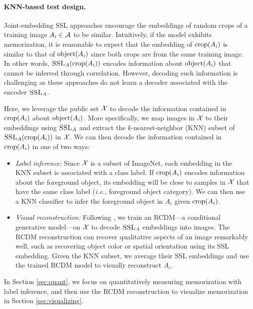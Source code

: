 \paragraph{KNN-based test design.} Joint-embedding SSL approaches encourage the embeddings of random crops of a training image $A_i \in \mathcal{A}$ to be similar. Intuitively, if the model exhibits \dejavu memorization, it is reasonable to expect that the embedding of $\mathrm{crop}({A_i})$ is similar to that of $\mathrm{object}({A_i})$ since both crops are from the same training image. In other words, $\textsc{SSL}_A(\mathrm{crop}({A_i}))$ encodes information about $\mathrm{object}({A_i})$ that cannot be inferred through correlation. However, decoding such information is challenging as these approaches do not learn a decoder associated with the encoder $\textsc{SSL}_A$.

Here, we leverage the public set $\mathcal{X}$ to decode the information contained in $\mathrm{crop}({A_i})$ about $\mathrm{object}({A_i})$. More specifically, we map images in $\mathcal{X}$ to their embeddings using $\textsc{SSL}_A$ and extract the $k$-nearest-neighbor (KNN) subset of $\textsc{SSL}_A(\mathrm{crop}({A_i}))$ in $\mathcal{X}$. We can then decode the information contained in $\mathrm{crop}({A_i})$ in one of two ways:
\begin{itemize}
\item \emph{Label inference:} Since $\mathcal{X}$ is a subset of ImageNet, each embedding in the KNN subset is associated with a class label. If $\mathrm{crop}({A_i})$ encodes information about the foreground object, its embedding will be close to samples in $\mathcal{X}$ that have the same class label (\emph{i.e.}, foreground object category). We can then use a KNN classifier to infer the foreground object in $A_i$ given $\mathrm{crop}({A_i})$.
\item \emph{Visual reconstruction:} Following \citet{RCDM}, we train an RCDM---a conditional generative model---on $\mathcal{X}$ to decode $\textsc{SSL}_A$ embeddings into images. The RCDM reconstruction can recover qualitative aspects of an image remarkably well, such as recovering object color or spatial orientation using its SSL embedding. Given the KNN subset, we average their SSL embeddings and use the trained RCDM model to visually reconstruct $A_i$.
\end{itemize}
In Section \ref{sec:quant}, we focus on quantitatively measuring \dejavu memorization with label inference, and then use the RCDM reconstruction to visualize \dejavu memorization in Section \ref{sec:visualizing}.